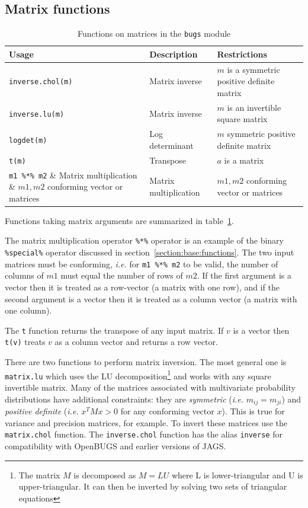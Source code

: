 \documentclass[11pt, a4paper, titlepage]{report}
\begin{document}
\subsection{Matrix functions}

\begin{table}
\begin{center}
\begin{tabular}{lll}
\hline
Usage & Description & Restrictions \\
\hline
\verb+inverse.chol(m)+ & Matrix inverse & $m$ is a symmetric positive definite matrix  \\
\verb+inverse.lu(m)+ & Matrix inverse & $m$ is an invertible square matrix  \\
\verb+logdet(m)+ & Log determinant & $m$ symmetric positive definite matrix \\
\verb+t(m)+    & Transpose                & $a$ is a matrix \\
\verb+m1 %*% m2+  & Matrix multiplication & $m1,m2$ conforming vector or matrices\\

\hline
\end{tabular}
\caption{Functions on matrices in the \texttt{bugs}
  module \label{table:bugs:matrix}}
\end{center}
\end{table}

Functions taking matrix arguments are summarized in
table~\ref{table:bugs:matrix}.

The matrix multiplication operator \verb+%*%+ operator is an example
of the binary \verb+%special%+ operator discussed in
section~\ref{section:base:functions}. The two input matrices must be
conforming, {\em i.e.} for \verb+m1 %*% m2+ to be valid, the number of
columns of $m1$ must equal the number of rows of $m2$. If the first
argument is a vector then it is treated as a row-vector (a matrix with
one row), and if the second argument is a vector then it is treated as
a column vector (a matrix with one column).

The \texttt{t} function returns the transpose of any input matrix. If
$v$ is a vector then \texttt{t(v)} treats $v$ as a column vector and
returns a row vector.

There are two functions to perform matrix inversion. The most general
one is \texttt{matrix.lu} which uses the LU decomposition\footnote{The
  matrix $M$ is decomposed as $M = LU$ where L is lower-triangular and
  U is upper-triangular. It can then be inverted by solving two sets
  of triangular equations} and works with any square invertible
matrix.  Many of the matrices associated with multivariate probability
distributions have additional constraints: they are {\em symmetric}
({\em i.e.} $m_{ij} = m_{ji}$) and {\em positive definite} ({\em i.e.}
$x^T M x > 0$ for any conforming vector $x$). This is true for
variance and precision matrices, for example. To invert these matrices
use the \texttt{matrix.chol} function. The \texttt{inverse.chol}
function has the alias \texttt{inverse} for compatibility with
OpenBUGS and earlier versions of JAGS.
\end{document}
